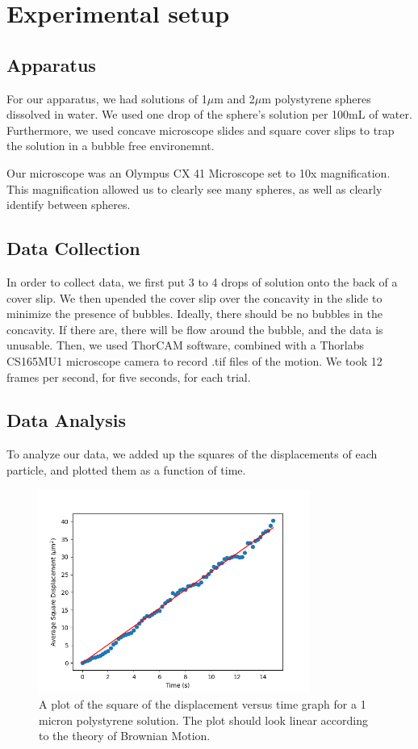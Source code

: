 \documentclass[10pt,letterpaper,onecolumn]{article}
\begin{document}
\section{Experimental setup}
\subsection{Apparatus}
For our apparatus, we had solutions of 1$\mu$m and 2$\mu$m polystyrene spheres dissolved in water.
We used one drop of the sphere's solution per 100mL of water. Furthermore, we used concave microscope slides
and square cover slips to trap the solution in a bubble free environemnt.

Our microscope was an Olympus CX 41 Microscope set to 10x magnification. This magnification allowed us to clearly see many spheres, as well as clearly identify between spheres.

\subsection{Data Collection}
In order to collect data, we first put 3 to 4 drops of solution onto the back of a cover slip. We then upended the cover slip
over the concavity in the slide to minimize the presence of bubbles. Ideally, there should be no bubbles in the concavity. If there are, there will be flow around the bubble, and the data is unusable.
Then, we used ThorCAM software, combined with a Thorlabs CS165MU1 microscope camera to record .tif files of the motion.
We took 12 frames per second, for five seconds, for each trial.
\subsection{Data Analysis}
To analyze our data, we added up the squares of the displacements of each particle, and plotted them as a function of time.
\begin{figure}
    \begin{center}
        \includegraphics*[width=3.5in]{trial3_1.png}
        \caption{A plot of the square of the displacement versus time graph for a 1 micron polystyrene solution. The plot should look linear according to the theory of Brownian Motion.}
    \end{center}
\end{figure}
\end{document}
